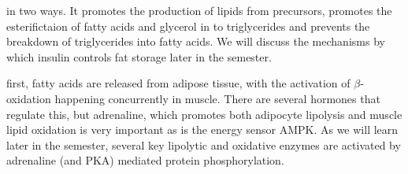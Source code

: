 \documentclass{tufte-handout}
\begin{document}
 in two ways.  It promotes the production of lipids from precursors, promotes the esterifictaion of fatty acids and glycerol in to triglycerides and prevents the breakdown of triglycerides into fatty acids.  We will discuss the mechanisms by which insulin controls fat storage later in the semester.

 first, fatty acids are released from adipose tissue, with the activation of $\beta$-oxidation happening concurrently in muscle.  There are several hormones that regulate this, but adrenaline, which promotes both adipocyte lipolysis and muscle lipid oxidation is very important as is the energy sensor AMPK.  As we will learn later in the semester, several key lipolytic and oxidative enzymes are activated by adrenaline (and PKA) mediated protein phosphorylation.



\end{document}
